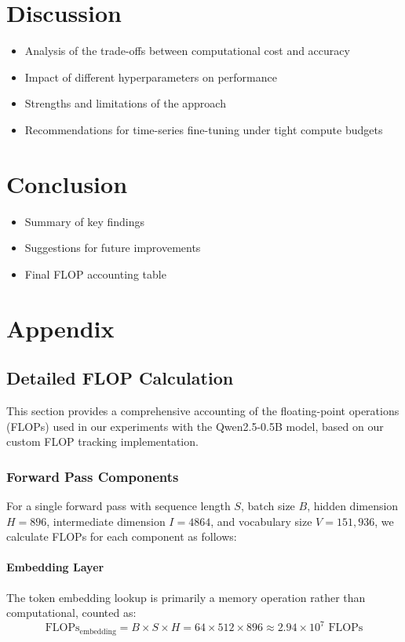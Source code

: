 \documentclass{article}
\begin{document}
\section*{ Discussion}
\begin{itemize}
    \item Analysis of the trade-offs between computational cost and accuracy
\item Impact of different hyperparameters on performance
\item Strengths and limitations of the approach
\item Recommendations for time-series fine-tuning under tight compute budgets
\end{itemize}


\section*{Conclusion}

\begin{itemize}
    \item  Summary of key findings
     \item Suggestions for future improvements
     \item Final FLOP accounting table
\end{itemize}

\section*{Appendix}
\subsection*{Detailed FLOP Calculation}

This section provides a comprehensive accounting of the floating-point operations (FLOPs) used in our experiments with the Qwen2.5-0.5B model, based on our custom FLOP tracking implementation.

\subsubsection*{Forward Pass Components}

For a single forward pass with sequence length $S$, batch size $B$, hidden dimension $H=896$, intermediate dimension $I=4864$, and vocabulary size $V=151,936$, we calculate FLOPs for each component as follows:

\paragraph{Embedding Layer}
The token embedding lookup is primarily a memory operation rather than computational, counted as:
\begin{equation}
\text{FLOPs}_{\text{embedding}} = B \times S \times H = 64 \times 512 \times 896 \approx 2.94 \times 10^7 \text{ FLOPs}
\end{equation}
\end{document}
